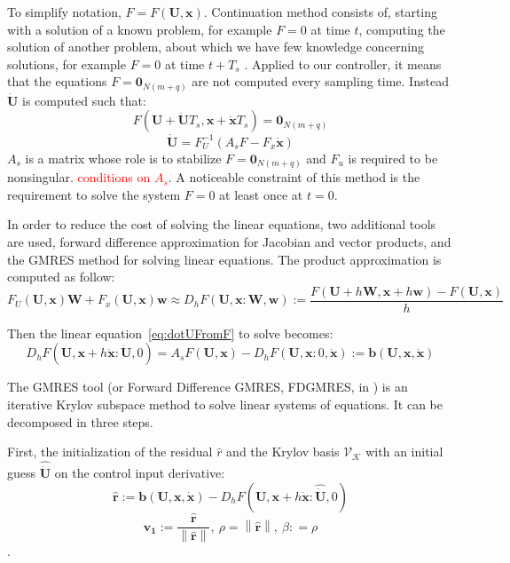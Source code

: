 \documentclass[a4paper, 12pt]{report}
\newcommand\norm[1]{\left\lVert#1\right\rVert}
\begin{document}
To simplify notation, $F = F(\boldsymbol{U},\boldsymbol{x})$. Continuation method consists of, starting with a solution of a known problem, for example $F = 0$ at time $t$, computing the solution of another problem, about which we have few knowledge concerning solutions, for example $F = 0$ at time $t + T_s$ \cite{Allgower1987}. Applied to our controller, it means that the equations $F = \boldsymbol{0}_{N(m+q)}$ are not computed every sampling time. Instead $\boldsymbol{\dot U}$ is computed such that:
\[ F(\boldsymbol{U} + \boldsymbol{\dot U}T_s,\boldsymbol{x} + \boldsymbol{\dot x} T_s) = \boldsymbol{0}_{N(m+q)} \]
\begin{equation}
\label{eq:dotUFromF}
\boldsymbol{\dot U} = F_U^{-1}(A_s F - F_x \boldsymbol{\dot x}) 
\end{equation}
$A_s$ is a matrix whose role is to stabilize $F = \boldsymbol{0}_{N(m+q)}$ and $F_u$ is required to be nonsingular. \textcolor{red}{conditions on $A_s$}. A noticeable constraint of this method is the requirement to solve the system $F=0$ at least once at $t=0$.

In order to reduce the cost of solving the linear equations, two additional tools are used, forward difference approximation for Jacobian and vector products, and the GMRES method for solving linear equations.
The product approximation is computed as follow:
\[ F_U(\boldsymbol{U}, \boldsymbol{x}) \boldsymbol{W} + F_x(\boldsymbol{U}, \boldsymbol{x}) \boldsymbol{w} \approx D_h F(\boldsymbol{U}, \boldsymbol{x} : \boldsymbol{W}, \boldsymbol{w}) := \frac{F(\boldsymbol{U} + h\boldsymbol{W}, \boldsymbol{x} + h\boldsymbol{w}) - F(\boldsymbol{U}, \boldsymbol{x})}{h} \]

Then the linear equation~\ref{eq:dotUFromF} to solve becomes:
\[ D_h F(\boldsymbol{U}, \boldsymbol{x}+ h\boldsymbol{\dot x} : \boldsymbol{\dot U}, 0) = A_s F(\boldsymbol{U}, \boldsymbol{x}) - D_h F(\boldsymbol{U}, \boldsymbol{x} : 0, \boldsymbol{\dot x}) := \boldsymbol{b}(\boldsymbol{U}, \boldsymbol{x}, \boldsymbol{\dot x}) \]

The GMRES tool (or Forward Difference GMRES, FDGMRES, in \cite{Kelley1995}) is an iterative Krylov subspace method to solve linear systems of equations. It can be decomposed in three steps.

First, the initialization of the residual $\hat r$ and the Krylov basis $\mathcal{V}_\mathcal{K}$ with an initial guess $\boldsymbol{\hat{ \dot U}}$ on the control input derivative:
\[ \boldsymbol{\hat r} := \boldsymbol{b}(\boldsymbol{U}, \boldsymbol{x}, \boldsymbol{\dot x}) - D_h F(\boldsymbol{U}, \boldsymbol{x}+ h\boldsymbol{\dot x} : \boldsymbol{\hat{\dot U}}, 0) \]
\[\boldsymbol{v_1} := \frac{\boldsymbol{\hat r}}{\norm{\boldsymbol{\hat r}}},\ \rho = \norm{\boldsymbol{\hat r}},\ \beta: = \rho \].
\end{document}
